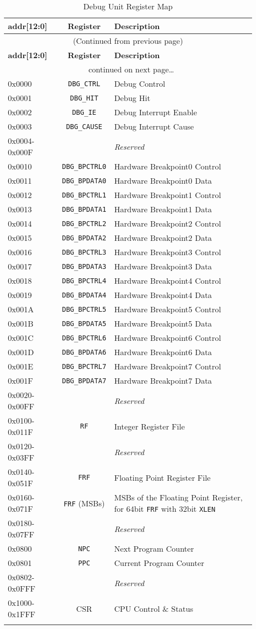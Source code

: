 \begin{longtable}[]{@{}lcp{6cm}@{}}
\toprule
\textbf{addr{[}12:0{]}} & \textbf{Register} & \textbf{Description}\tabularnewline
\midrule
\endfirsthead
\multicolumn{3}{c}{{(Continued from previous page)}} \\
\toprule
\textbf{addr{[}12:0{]}} & \textbf{Register} & \textbf{Description}\tabularnewline
\midrule
\endhead
\midrule \multicolumn{3}{c}{{\tablename\ \thetable{} continued on next page\ldots}} \\
\endfoot
\endlastfoot

0x0000        & \texttt{DBG\_CTRL} & Debug Control\tabularnewline
0x0001        & \texttt{DBG\_HIT} & Debug Hit\tabularnewline
0x0002        & \texttt{DBG\_IE} & Debug Interrupt Enable\tabularnewline
0x0003        & \texttt{DBG\_CAUSE} & Debug Interrupt Cause\tabularnewline
0x0004-0x000F & & \emph{Reserved}\tabularnewline
0x0010        & \texttt{DBG\_BPCTRL0} & Hardware Breakpoint0 Control\tabularnewline
0x0011        & \texttt{DBG\_BPDATA0} & Hardware Breakpoint0 Data\tabularnewline
0x0012        & \texttt{DBG\_BPCTRL1} & Hardware Breakpoint1 Control\tabularnewline
0x0013        & \texttt{DBG\_BPDATA1} & Hardware Breakpoint1 Data\tabularnewline
0x0014        & \texttt{DBG\_BPCTRL2} & Hardware Breakpoint2 Control\tabularnewline
0x0015        & \texttt{DBG\_BPDATA2} & Hardware Breakpoint2 Data\tabularnewline
0x0016        & \texttt{DBG\_BPCTRL3} & Hardware Breakpoint3 Control\tabularnewline
0x0017        & \texttt{DBG\_BPDATA3} & Hardware Breakpoint3 Data\tabularnewline
0x0018        & \texttt{DBG\_BPCTRL4} & Hardware Breakpoint4 Control\tabularnewline
0x0019        & \texttt{DBG\_BPDATA4} & Hardware Breakpoint4 Data\tabularnewline
0x001A        & \texttt{DBG\_BPCTRL5} & Hardware Breakpoint5 Control\tabularnewline
0x001B        & \texttt{DBG\_BPDATA5} & Hardware Breakpoint5 Data\tabularnewline
0x001C        & \texttt{DBG\_BPCTRL6} & Hardware Breakpoint6 Control\tabularnewline
0x001D        & \texttt{DBG\_BPDATA6} & Hardware Breakpoint6 Data\tabularnewline
0x001E        & \texttt{DBG\_BPCTRL7} & Hardware Breakpoint7 Control\tabularnewline
0x001F        & \texttt{DBG\_BPDATA7} & Hardware Breakpoint7 Data\tabularnewline
0x0020-0x00FF & & \emph{Reserved}\tabularnewline
0x0100-0x011F & \texttt{RF} & Integer Register File\tabularnewline
0x0120-0x03FF & & \emph{Reserved}\tabularnewline
0x0140-0x051F & \texttt{FRF} & Floating Point Register File\tabularnewline
0x0160-0x071F & \texttt{FRF} (MSBs) & MSBs of the Floating Point Register, for
64bit \texttt{FRF} with 32bit \texttt{XLEN}\tabularnewline
0x0180-0x07FF & & \emph{Reserved}\tabularnewline
0x0800        & \texttt{NPC}  & Next Program Counter\tabularnewline
0x0801        & \texttt{PPC}  & Current Program Counter\tabularnewline
0x0802-0x0FFF & & \emph{Reserved}\tabularnewline
0x1000-0x1FFF & CSR & CPU Control \& Status\tabularnewline
\bottomrule
\caption{Debug Unit Register Map}
\label{tab:debug-reg-map}
\end{longtable}

